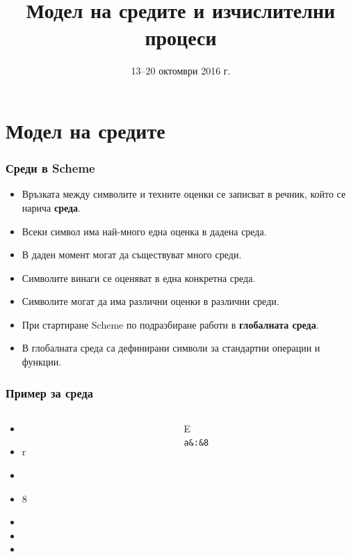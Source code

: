 \documentclass{beamer}
\title[Среди и процеси]{Модел на средите и изчислителни процеси}
\date{13--20 октомври 2016 г.}
\begin{document}
\begin{frame}
  \titlepage
\end{frame}

\section{Модел на средите}

\begin{frame}
  \frametitle{Среди в Scheme}

  \begin{itemize}[<+->]
  \item Връзката между символите и техните оценки се записват в речник, който се нарича \textbf{среда}.
  \item Всеки символ има най-много една оценка в дадена среда.
  \item В даден момент могат да съществуват много среди.
  \item Символите винаги се оценяват в една конкретна среда.
  \item \alert{Символите могат да има различни оценки в различни среди.}
  \item При стартиране Scheme по подразбиране работи в \textbf{глобалната среда}.
  \item В глобалната среда са дефинирани символи за стандартни операции и функции.
  \end{itemize}
\end{frame}

\begin{frame}
  \frametitle{Пример за среда}

  \begin{columns}[T,onlytextwidth]
    \begin{column}{.5\textwidth}
      \begin{itemize}[<+->]
      \item {}
      \item \evalstoerr r
      \item {}
      \item {}8
      \item {}
      \item {}
      \item {}
      \end{itemize}
    \end{column}

    \begin{column}{.5\textwidth}
      \begin{envir}{E}
        \\\firstinenv \tt a&:&8
      \end{envir}
    \end{column}
  \end{columns}
\end{frame}
\end{document}
